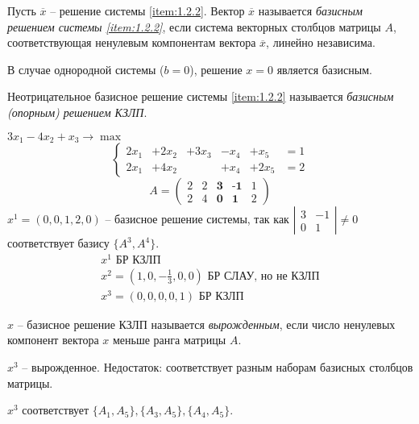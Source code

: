 \begin{definition}
    Пусть $ \overline{x} $ -- решение системы \ref{item:1.2.2}. Вектор $ \overline{x} $ называется \emph{базисным решением системы \ref{item:1.2.2}}, если система векторных столбцов матрицы $ A $, соответствующая ненулевым компонентам вектора $ \overline{x} $, линейно независима.
\end{definition}

\begin{remark}
    В случае однородной системы ($ b = 0 $), решение $ x = 0 $ является базисным.
\end{remark}

\begin{definition}
    Неотрицательное базисное решение системы \ref{item:1.2.2} называется \emph{базисным (опорным) решением КЗЛП}.
\end{definition}

\begin{example}
    $ 3x_1 - 4x_2 + x_3 \rightarrow \max $
    \[
        \left\{\begin{array}{cccccc}
            2x_1 & + 2x_2 & + 3x_3 & - x_4 & + x_5  & = 1 \\
            2x_1 & + 4x_2 &        & + x_4 & + 2x_5 & = 2
        \end{array}\right.
    \]
    \[
        A = \left(\begin{matrix}
                2 & 2 & \textbf{3} & \textbf{-1} & 1 \\
                2 & 4 & \textbf{0} & \textbf{1}  & 2
            \end{matrix}\right)
    \]
    $ x^1 = (0,0,1,2,0) $ -- базисное решение системы, так как $ \left|\begin{matrix}
            3 & -1 \\ 0 & 1
        \end{matrix}\right| \ne 0 $ соответствует базису $ \{A^3,A^4\} $.
    \[
        \begin{array}{l}
            x^1 \text{ БР КЗЛП}                                                 \\
            x^2 = \left(1,0,-\frac{1}{3},0,0\right) \text{ БР СЛАУ, но не КЗЛП} \\
            x^3 = (0,0,0,0,1) \text{ БР КЗЛП}
        \end{array}
    \]
\end{example}

\begin{definition}
    $ x $ -- базисное решение КЗЛП называется \emph{вырожденным}, если число ненулевых компонент вектора $ x $ меньше ранга матрицы $ A $.
\end{definition}

\begin{remark}
    $ x^3 $ -- вырожденное. Недостаток: соответствует разным наборам базисных столбцов матрицы.

    $ x^3 $ соответствует $ \{A_1,A_5\}, \{A_3,A_5\}, \{A_4,A_5\} $.
\end{remark}